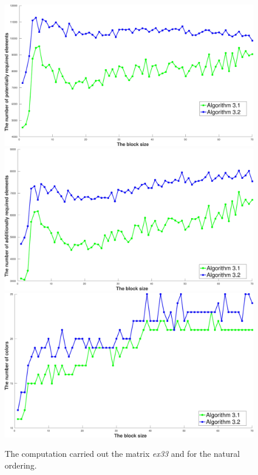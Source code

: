 \documentclass[12pt, twoside,a4paper,toc=bibliography]{scrbook}
\begin{document}
\begin{figure}
\centering
\includegraphics[width=0.75\linewidth]{ex33_alg31_alg32_bls_slo_pot}
\includegraphics[width=0.75\linewidth]{ex33_alg31_alg32_bls_slo_add}
\includegraphics[width=0.75\linewidth]{ex33_alg31_alg32_bls_slo_cols}
\caption{The computation carried  out the matrix \textit{ex33} and for the natural ordering.}
\label{ex33_alg31_alg32_bls_slo}
\end{figure}
\end{document}
